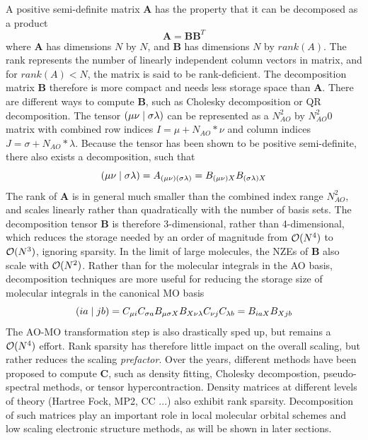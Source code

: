 A positive semi-definite matrix $\mathbf{A}$ has the property that it can be decomposed as a product 
\begin{equation}
\mathbf{A} = \mathbf{B} \mathbf{B}^T
\end{equation}
\noindent where $\mathbf{A}$ has dimensions $N$ by $N$, and $\mathbf{B}$ has dimensions $N$ by $rank(A)$. The rank represents the number of linearly independent column vectors in matrix, and for $rank(A) < N$, the matrix is said to  be rank-deficient. The decomposition matrix $\mathbf{B}$ therefore is more compact and needs less storage space than $\mathbf{A}$. There are different ways to compute $\mathbf{B}$, such as Cholesky decomposition or QR decomposition.
The tensor $\left( \mu\nu \mid \sigma\lambda \right)$ can be represented as a $N_{AO}^2$
by $N_{AO}^2$0 matrix with combined row indices $I = \mu + N_{AO}*\nu$ and column indices $J = \sigma + N_{AO}*\lambda$. Because the tensor has been shown to be positive semi-definite, there also exists a decomposition, such that
\begin{equation}
\left( \mu\nu \mid \sigma\lambda \right) = A_{(\mu\nu)(\sigma\lambda)} = B_{(\mu\nu)X} B_{(\sigma\lambda)X}
\end{equation}
\noindent The rank of $\mathbf{A}$ is in general much smaller than the combined index range $N_{AO}^2$, and scales linearly rather than quadratically with the number of basis sets. The decomposition tensor $\mathbf{B}$ is therefore 3-dimensional, rather than 4-dimensional, which reduces the storage needed by an order of magnitude from $\mathcal{O}(N^{4})$ to $\mathcal{O}(N^{3})$, ignoring sparsity. In the limit of large molecules, the NZEs of $\mathbf{B}$ also scale with $\mathcal{O}(N^{2})$. Rather than for the molecular integrals in the AO basis, decomposition techniques are more useful for reducing the storage size of molecular integrals in the canonical MO basis
\begin{equation}
\left( ia \mid jb \right) = C_{\mu i} C_{\sigma a} B_{\mu \sigma X} B_{X \nu \lambda} C_{\nu j} C_{\lambda b} = B_{iaX} B_{Xjb}
\end{equation} 
\noindent The AO-MO transformation step is also drastically sped up, but remains a $\mathcal{O}(N^{4})$ effort. Rank sparsity has therefore little impact on the overall scaling, but rather reduces the scaling \emph{prefactor}. Over the years, different methods have been proposed to compute $\mathbf{C}$, such as density fitting, Cholesky decompostion, pseudo-spectral methods, or tensor hypercontraction.
Density matrices at different levels of theory (Hartree Fock, MP2, CC ...) also exhibit rank sparsity. Decomposition of such matrices play an important role in local molecular orbital schemes and low scaling electronic structure methods, as will be shown in later sections.

